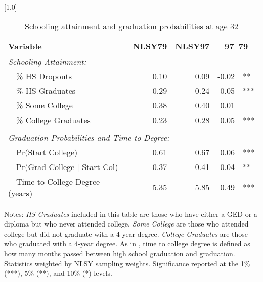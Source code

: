 \begin{table}[ht]
\caption{Schooling attainment and graduation probabilities at age 32}
\label{tab:degree}
\centering
\scalebox{1.0}[1.0]{%
\begin{threeparttable}
\begin{tabular}{lrrr@{}l}
\toprule 
Variable & NLSY79 & NLSY97 & \multicolumn{2}{c}{97--79} \\
\midrule 
\multicolumn{5}{l}{\emph{Schooling Attainment:}} \\
~~\% HS Dropouts                      & 0.10 & 0.09 & -0.02 &    ** \\ 
~~\% HS Graduates                     & 0.29 & 0.24 & -0.05 &   *** \\ 
~~\% Some College                     & 0.38 & 0.40 & 0.01 &      \\ 
~~\% College Graduates                & 0.23 & 0.28 & 0.05 &   *** \\ 
\vspace{-6pt}  \\
\multicolumn{5}{l}{\emph{Graduation Probabilities and Time to Degree:}} \\
~~Pr(Start College)                   & 0.61 & 0.67 & 0.06 &     *** \\ 
~~Pr(Grad College $\vert$ Start Col)  & 0.37 & 0.41 & 0.04 &  ** \\ 
~~Time to College Degree (years)      & 5.35 & 5.85 & 0.49 &   *** \\ 
\bottomrule 
\end{tabular} 
\footnotesize{Notes: \emph{HS Graduates} included in this table are those who have either a GED or a diploma but who never attended college. \emph{Some College} are those who attended college but did not graduate with a 4-year degree. \emph{College Graduates} are those who graduated with a 4-year degree. As in \citep{bound2012}, time to college degree is defined as how many months passed between high school graduation and graduation. Statistics weighted by NLSY sampling weights. Significance reported at the 1\% (***), 5\% (**), and 10\% (*) levels.}
\end{threeparttable} 
} 
\end{table} 
